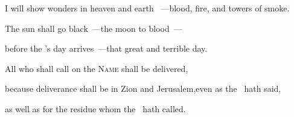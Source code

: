 
\begin{inparaenum}
  \pa{} I will show wonders in heaven and earth%
  ~---\pa{}blood, fire, and towers%
  of smoke.%

  \pa{} The sun shall go black~---\pa{}the moon to blood~---%

  \pa{}before the \lord's day arrives~---\pa{}that great and terrible day.%

  \pa{} All who shall call on the \textsc{Name} shall be delivered,%

  \pa{}because deliverance shall be in Zion and Jerusalem,\pa{}even as the \lord\ hath said,%

  \pa{}as well as for the residue whom the \lord\ hath called.%
\end{inparaenum}
